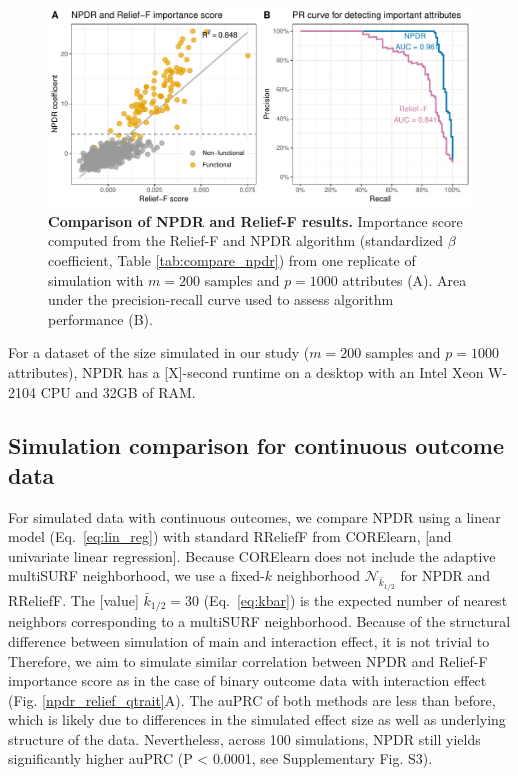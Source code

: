 \documentclass[10pt]{article}
\begin{document}
\begin{figure}[!tbp]
\centerline{\includegraphics[trim = 0 0 0 0]{../figs/npdr_relief_cc_1000.pdf}}
\caption{{\bf Comparison of NPDR and Relief-F results.} Importance score computed from the Relief-F and NPDR algorithm (standardized $\beta$ coefficient, Table \ref{tab:compare_npdr}) from one replicate of simulation with $m = 200$ samples and $p = 1000$ attributes (A). Area under the precision-recall curve used to assess algorithm performance (B).}
\label{fig:npdr_relief_cc}
\end{figure}

For a dataset of the size simulated in our study ($m=200$ samples and $p=1000$ attributes), NPDR has a [X]-second runtime on a desktop with an Intel Xeon W-2104 CPU and 32GB of RAM. 


\subsection{Simulation comparison for continuous outcome data} 
For simulated data with continuous outcomes, we compare NPDR using a linear model (Eq.~\ref{eq:lin_reg}) with standard RReliefF from CORElearn, [and univariate linear regression].
Because CORElearn does not include the adaptive multiSURF neighborhood, we use a fixed-$k$ neighborhood $\mathcal{N}_{\bar{k}_{1/2}}$ for NPDR and RReliefF.
The [value] $\bar{k}_{1/2}=30$ (Eq.~\ref{eq:kbar}) is the expected number of nearest neighbors corresponding to a multiSURF neighborhood.
Because of the structural difference between simulation of main and interaction effect, it is not trivial to 
Therefore, we aim to simulate similar correlation between NPDR and Relief-F importance score as in the case of binary outcome data with interaction effect (Fig. \ref{npdr_relief_qtrait}A).
The auPRC of both methods are less than before, which is likely due to differences in the simulated effect size as well as underlying structure of the data.
Nevertheless, across 100 simulations, NPDR still yields significantly higher auPRC (P < 0.0001, see Supplementary Fig. S3).
\end{document}
